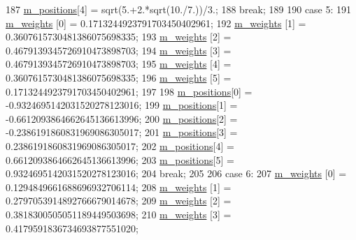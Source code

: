 \begin{DoxyCode}
187       \hyperlink{class_q_u_e_s_o_1_1_base1_d_quadrature_aeda387c028c3ba89ea0f9637a2234212}{m\_positions}[4] =  sqrt(5.+2.*sqrt(10./7.))/3.;
188     \textcolor{keywordflow}{break};
189 
190     \textcolor{keywordflow}{case} 5:
191       \hyperlink{class_q_u_e_s_o_1_1_base1_d_quadrature_a7117fec020a8098d1c22b604268bad93}{m\_weights}  [0] =  0.1713244923791703450402961;
192       \hyperlink{class_q_u_e_s_o_1_1_base1_d_quadrature_a7117fec020a8098d1c22b604268bad93}{m\_weights}  [1] =  0.3607615730481386075698335;
193       \hyperlink{class_q_u_e_s_o_1_1_base1_d_quadrature_a7117fec020a8098d1c22b604268bad93}{m\_weights}  [2] =  0.4679139345726910473898703;
194       \hyperlink{class_q_u_e_s_o_1_1_base1_d_quadrature_a7117fec020a8098d1c22b604268bad93}{m\_weights}  [3] =  0.4679139345726910473898703;
195       \hyperlink{class_q_u_e_s_o_1_1_base1_d_quadrature_a7117fec020a8098d1c22b604268bad93}{m\_weights}  [4] =  0.3607615730481386075698335;
196       \hyperlink{class_q_u_e_s_o_1_1_base1_d_quadrature_a7117fec020a8098d1c22b604268bad93}{m\_weights}  [5] =  0.1713244923791703450402961;
197 
198       \hyperlink{class_q_u_e_s_o_1_1_base1_d_quadrature_aeda387c028c3ba89ea0f9637a2234212}{m\_positions}[0] = -0.9324695142031520278123016;
199       \hyperlink{class_q_u_e_s_o_1_1_base1_d_quadrature_aeda387c028c3ba89ea0f9637a2234212}{m\_positions}[1] = -0.6612093864662645136613996;
200       \hyperlink{class_q_u_e_s_o_1_1_base1_d_quadrature_aeda387c028c3ba89ea0f9637a2234212}{m\_positions}[2] = -0.2386191860831969086305017;
201       \hyperlink{class_q_u_e_s_o_1_1_base1_d_quadrature_aeda387c028c3ba89ea0f9637a2234212}{m\_positions}[3] =  0.2386191860831969086305017;
202       \hyperlink{class_q_u_e_s_o_1_1_base1_d_quadrature_aeda387c028c3ba89ea0f9637a2234212}{m\_positions}[4] =  0.6612093864662645136613996;
203       \hyperlink{class_q_u_e_s_o_1_1_base1_d_quadrature_aeda387c028c3ba89ea0f9637a2234212}{m\_positions}[5] =  0.9324695142031520278123016;
204     \textcolor{keywordflow}{break};
205 
206     \textcolor{keywordflow}{case} 6:
207       \hyperlink{class_q_u_e_s_o_1_1_base1_d_quadrature_a7117fec020a8098d1c22b604268bad93}{m\_weights}  [0] =  0.1294849661688696932706114;
208       \hyperlink{class_q_u_e_s_o_1_1_base1_d_quadrature_a7117fec020a8098d1c22b604268bad93}{m\_weights}  [1] =  0.2797053914892766679014678;
209       \hyperlink{class_q_u_e_s_o_1_1_base1_d_quadrature_a7117fec020a8098d1c22b604268bad93}{m\_weights}  [2] =  0.3818300505051189449503698;
210       \hyperlink{class_q_u_e_s_o_1_1_base1_d_quadrature_a7117fec020a8098d1c22b604268bad93}{m\_weights}  [3] =  0.4179591836734693877551020;

\end{DoxyCode}
